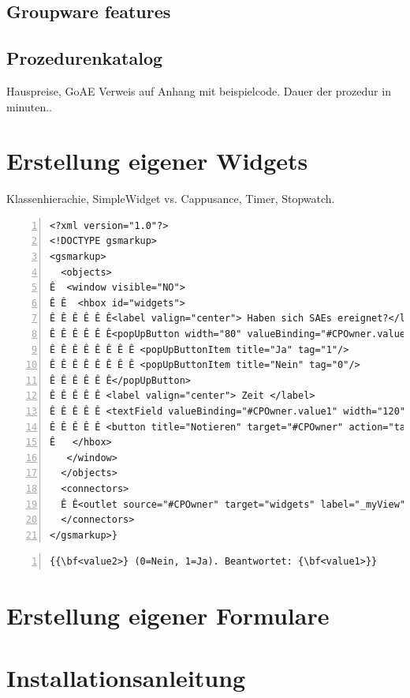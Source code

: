 \documentclass[11pt,oneside]{scrbook}
\begin{document}
\section{Groupware features}

\section{Prozedurenkatalog}
Hauspreise, GoAE
Verweis auf Anhang mit beispielcode. Dauer der prozedur in minuten..

\begin{appendix}

\chapter{Erstellung eigener Widgets}
Klassenhierachie, SimpleWidget vs. Cappusance, Timer, Stopwatch.

\begin{lstlisting}[caption=Complete source code of a minimalistic widget.,  label= lst:form, basicstyle={\small\ttfamily}, numbers=left]
<?xml version="1.0"?>
<!DOCTYPE gsmarkup>
<gsmarkup>
  <objects>
Ê  <window visible="NO">
Ê Ê  <hbox id="widgets">
Ê Ê Ê Ê Ê Ê<label valign="center"> Haben sich SAEs ereignet?</label>
Ê Ê Ê Ê Ê Ê<popUpButton width="80" valueBinding="#CPOwner.value2">
Ê Ê Ê Ê Ê Ê Ê Ê <popUpButtonItem title="Ja" tag="1"/>
Ê Ê Ê Ê Ê Ê Ê Ê <popUpButtonItem title="Nein" tag="0"/>
Ê Ê Ê Ê Ê Ê</popUpButton>
Ê Ê Ê Ê Ê <label valign="center"> Zeit </label>
Ê Ê Ê Ê Ê <textField valueBinding="#CPOwner.value1" width="120" halign="min"/>
Ê Ê Ê Ê Ê <button title="Notieren" target="#CPOwner" action="takeTime:"/>
Ê   </hbox>
   </window>
  </objects>
  <connectors>
  Ê Ê<outlet source="#CPOwner" target="widgets" label="_myView"/>
  </connectors>
</gsmarkup>}
\end{lstlisting}

\begin{lstlisting}[caption=Corresponding LaTeX template.,  label= lst:form, basicstyle={\small\ttfamily}, numbers=left]
{{\bf<value2>} (0=Nein, 1=Ja). Beantwortet: {\bf<value1>}}
\end{lstlisting}
\chapter{Erstellung eigener Formulare}

\chapter{Installationsanleitung}


\end{appendix}
\end{document}
